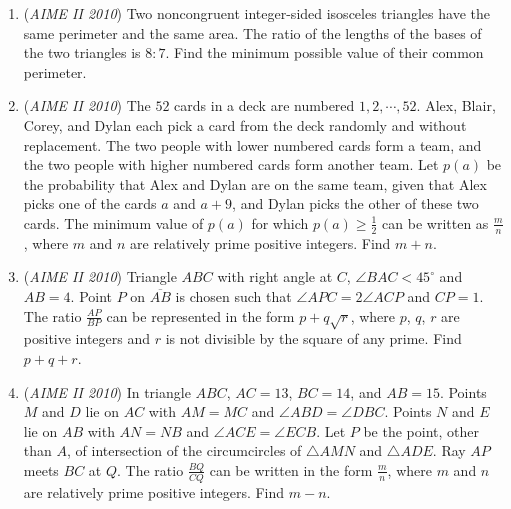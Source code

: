 \begin{enumerate}
 
            \begin{enumerate}

        \item Exactly five of the entries are $1$'s, and the remaining four entries are $0$'s.

        \item Among the eight rows, columns, and long diagonals (the long diagonals are $\{a_{13},a_{22},a_{31}\}$ and $\{a_{11},a_{22},a_{33}\})$, no more than one of the eight has all three entries equal.
            \end{enumerate}
            Find the number of distinct \textit{T-grids}.


 

	\item (\textit{AIME II 2010}) Two noncongruent integer-sided isosceles triangles have the same perimeter and the same area. The ratio of the lengths of the bases of the two triangles is $8: 7$. Find the minimum possible value of their common perimeter.


 

	\item (\textit{AIME II 2010}) The $52$ cards in a deck are numbered $1, 2, \cdots, 52$. Alex, Blair, Corey, and Dylan each pick a card from the deck randomly and without replacement. The two people with lower numbered cards form a team, and the two people with higher numbered cards form another team. Let $p(a)$ be the probability that Alex and Dylan are on the same team, given that Alex picks one of the cards $a$ and $a+9$, and Dylan picks the other of these two cards. The minimum value of $p(a)$ for which $p(a)\ge\frac{1}{2}$ can be written as $\frac{m}{n}$, where $m$ and $n$ are relatively prime positive integers. Find $m+n$.


 

	\item (\textit{AIME II 2010}) Triangle $ABC$ with right angle at $C$, $\angle BAC < 45^\circ$ and $AB = 4$. Point $P$ on $\overline{AB}$ is chosen such that $\angle APC = 2\angle ACP$ and $CP = 1$. The ratio $\frac{AP}{BP}$ can be represented in the form $p + q\sqrt{r}$, where $p$, $q$, $r$ are positive integers and $r$ is not divisible by the square of any prime. Find $p+q+r$.


 

	\item (\textit{AIME II 2010}) In triangle $ABC$, $AC=13$, $BC=14$, and $AB=15$. Points $M$ and $D$ lie on $AC$ with $AM=MC$ and $\angle ABD = \angle DBC$. Points $N$ and $E$ lie on $AB$ with $AN=NB$ and $\angle ACE = \angle ECB$. Let $P$ be the point, other than $A$, of intersection of the circumcircles of $\triangle AMN$ and $\triangle ADE$. Ray $AP$ meets $BC$ at $Q$. The ratio $\frac{BQ}{CQ}$ can be written in the form $\frac{m}{n}$, where $m$ and $n$ are relatively prime positive integers. Find $m-n$.


 

\end{enumerate}